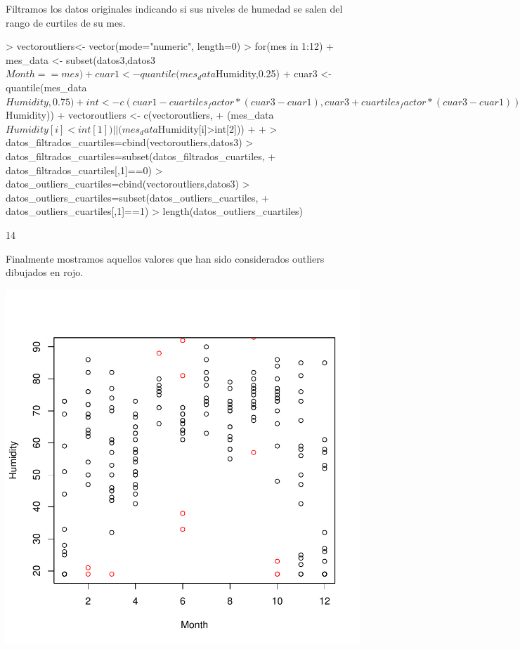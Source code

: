 \documentclass [a4paper] {article}
\begin{document}
Filtramos los datos originales indicando si sus niveles de humedad se salen del rango de curtiles de su mes.
\begin{Schunk}
\begin{Sinput}
> vectoroutliers<- vector(mode="numeric", length=0)
> for(mes in 1:12){
+   mes_data <- subset(datos3,datos3$Month==mes)
+   cuar1 <- quantile(mes_data$Humidity,0.25)
+   cuar3 <- quantile(mes_data$Humidity,0.75)
+   int <- c(cuar1-cuartiles_factor*(cuar3-cuar1), cuar3+cuartiles_factor*(cuar3-cuar1))
+   for(i in 1:length(mes_data$Humidity)){
+     vectoroutliers <- c(vectoroutliers, 
+       (mes_data$Humidity[i]<int[1])||(mes_data$Humidity[i]>int[2]))
+   }
+ }
> datos_filtrados_cuartiles=cbind(vectoroutliers,datos3)
> datos_filtrados_cuartiles=subset(datos_filtrados_cuartiles,
+   datos_filtrados_cuartiles[,1]==0)
> datos_outliers_cuartiles=cbind(vectoroutliers,datos3)
> datos_outliers_cuartiles=subset(datos_outliers_cuartiles,
+   datos_outliers_cuartiles[,1]==1)
> length(datos_outliers_cuartiles)
\end{Sinput}
\begin{Soutput}
[1] 14
\end{Soutput}
\end{Schunk}

Finalmente mostramos aquellos valores que han sido considerados outliers dibujados en rojo.
\begin{center}
\includegraphics{entrega-datos_humedad_mes_filtrados}
\end{center}
\end{document}
